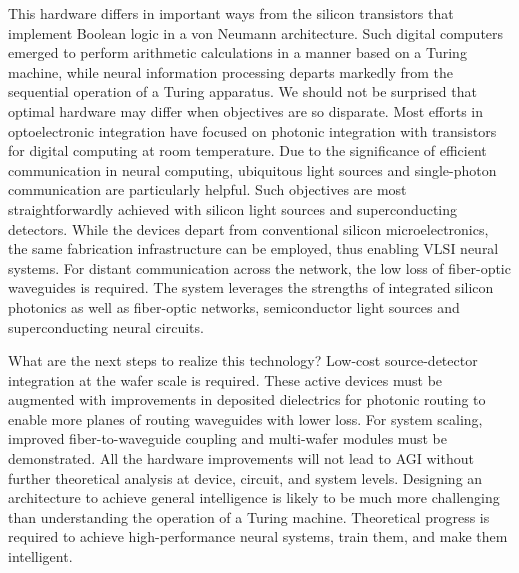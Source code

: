 \documentclass[twocolumn]{article}
\begin{document}
This hardware differs in important ways from the silicon transistors that implement Boolean logic in a von Neumann architecture. Such digital computers emerged to perform arithmetic calculations in a manner based on a Turing machine, while neural information processing departs markedly from the sequential operation of a Turing apparatus. We should not be surprised that optimal hardware may differ when objectives are so disparate. Most efforts in optoelectronic integration have focused on photonic integration with transistors for digital computing at room temperature. Due to the significance of efficient communication in neural computing, ubiquitous light sources and single-photon communication are particularly helpful. Such objectives are most straightforwardly achieved with silicon light sources and superconducting detectors. While the devices depart from conventional silicon microelectronics, the same fabrication infrastructure can be employed, thus enabling VLSI neural systems. For distant communication across the network, the low loss of fiber-optic waveguides is required. The system leverages the strengths of integrated silicon photonics as well as fiber-optic networks, semiconductor light sources and superconducting neural circuits.

What are the next steps to realize this technology? Low-cost source-detector integration at the wafer scale is required. These active devices must be augmented with improvements in deposited dielectrics for photonic routing to enable more planes of routing waveguides with lower loss. For system scaling, improved fiber-to-waveguide coupling and multi-wafer modules must be demonstrated. All the hardware improvements will not lead to AGI without further theoretical analysis at device, circuit, and system levels. Designing an architecture to achieve general intelligence is likely to be much more challenging than understanding the operation of a Turing machine. Theoretical progress is required to achieve high-performance neural systems, train them, and make them intelligent.



\end{document}

